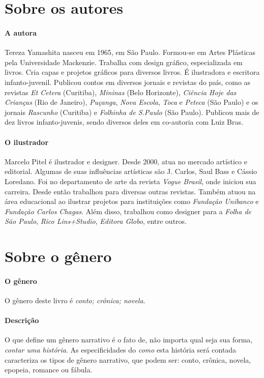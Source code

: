 \documentclass[11pt]{extarticle}
\begin{document}
\section{Sobre os autores}

\paragraph{A autora} Tereza Yamashita nasceu em 1965, em São Paulo. Formou-se em Artes Plásticas pela Universidade Mackenzie. Trabalha com design gráfico, especializada em livros. Cria capas e projetos gráficos para diversos livros. É ilustradora e escritora infanto-juvenil. Publicou contos em diversos jornais e revistas do país, como as revistas \textit{Et Cetera} (Curitiba), \textit{Mininas} (Belo Horizonte), \textit{Ciência Hoje das Crianças} (Rio de Janeiro), \textit{Puçanga}, \textit{Nova Escola}, \textit{Toca} e \textit{Peteca} (São Paulo) e os jornais \textit{Rascunho} (Curitiba) e \textit{Folhinha de S.Paulo} (São Paulo). Publicou mais de dez livros infanto-juvenis, sendo diversos deles em co-autoria com Luiz Bras.

\paragraph{O ilustrador} Marcelo Pitel é ilustrador e designer. Desde 2000, atua no mercado artístico e editorial. Algumas de suas influências artísticas são J. Carlos, Saul Bass e Cássio Loredano. Foi no departamento de arte da revista \textit{Vogue Brasil}, onde iniciou sua carreira. Desde então trabalhou para diversas outras revistas. Também atuou na área educacional ao ilustrar projetos para instituições como \textit{Fundação Unibanco} e \textit{Fundação Carlos Chagas}. Além disso, trabalhou como designer para a \textit{Folha de São Paulo}, \textit{Rico Lins+Studio}, \textit{Editora Globo}, entre outros.


\section{Sobre o gênero}

\paragraph{O gênero} O gênero deste livro é \textit{conto; crônica; novela}.

\paragraph{Descrição} O que define um gênero narrativo é o fato de, não importa qual seja sua forma, \textit{contar uma história}.
As especificidades do \textit{como} esta história será contada caracteriza os tipos de gênero narrativo, que podem ser: conto, crônica, novela, epopeia, romance ou fábula. 
\end{document}
